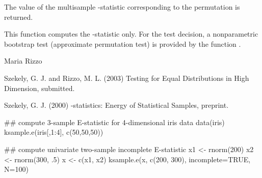 \begin{Value}
The value of the multisample -statistic corresponding to
the permutation  is returned.\end{Value}
\begin{Note}\relax
This function computes the -statistic only. 
For the test decision,
a nonparametric bootstrap test (approximate permutation test)
is provided by the function .
\end{Note}
\begin{Author}\relax
Maria Rizzo 
\end{Author}
\begin{References}\relax
Szekely, G. J. and Rizzo, M. L. (2003) Testing for Equal
Distributions in High Dimension, submitted.

Szekely, G. J. (2000) -statistics: Energy of 
Statistical Samples, preprint.\end{References}
\begin{SeeAlso}\relax
{}
\end{SeeAlso}
\begin{Examples}
\begin{ExampleCode}
## compute 3-sample E-statistic for 4-dimensional iris data
 data(iris)
 ksample.e(iris[,1:4], c(50,50,50))

## compute univariate two-sample incomplete E-statistic
 x1 <- rnorm(200)
 x2 <- rnorm(300, .5)
 x <- c(x1, x2)
 ksample.e(x, c(200, 300), incomplete=TRUE, N=100)
 
\end{ExampleCode}
\end{Examples}

